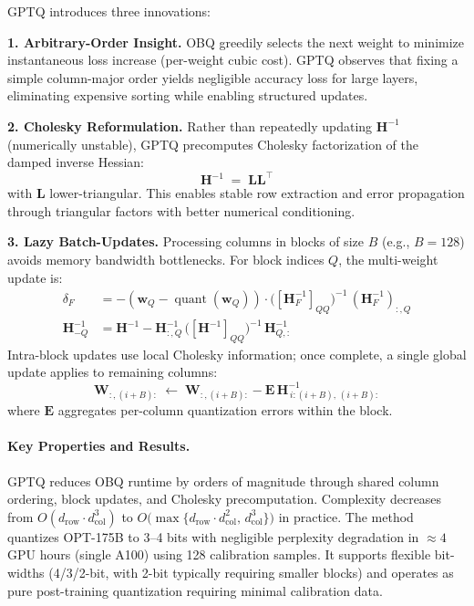 GPTQ introduces three innovations:

\textbf{1. Arbitrary-Order Insight.} OBQ greedily selects the next weight to minimize instantaneous loss increase (per-weight cubic cost). GPTQ observes that fixing a simple column-major order yields negligible accuracy loss for large layers, eliminating expensive sorting while enabling structured updates.

\textbf{2. Cholesky Reformulation.} Rather than repeatedly updating $\bm{H}^{-1}$ (numerically unstable), GPTQ precomputes Cholesky factorization of the damped inverse Hessian:
\begin{equation}
\bm{H}^{-1} \;=\; \bm{L}\bm{L}^\top
\end{equation}
with $\bm{L}$ lower-triangular. This enables stable row extraction and error propagation through triangular factors with better numerical conditioning.

\textbf{3. Lazy Batch-Updates.} Processing columns in blocks of size $B$ (e.g., $B=128$) avoids memory bandwidth bottlenecks. For block indices $Q$, the multi-weight update is:
\begin{align}
\delta_F &= - ( \bm{w}_Q - \operatorname{quant}(\bm{w}_Q) ) \cdot \big( [\bm{H}_F^{-1}]_{QQ} \big)^{-1} \, (\bm{H}_F^{-1})_{:,Q} \\
\bm{H}^{-1}_{-Q} &= \bm{H}^{-1} - \bm{H}^{-1}_{:,Q} \, \big( [\bm{H}^{-1}]_{QQ} \big)^{-1} \, \bm{H}^{-1}_{Q,:}
\end{align}
Intra-block updates use local Cholesky information; once complete, a single global update applies to remaining columns:
\begin{equation}
\bm{W}_{:,(i+B):} \;\leftarrow\; \bm{W}_{:,(i+B):} - \bm{E}\,\bm{H}^{-1}_{\,i:(i+B),\,(i+B):}
\end{equation}
where $\bm{E}$ aggregates per-column quantization errors within the block.

\paragraph{Key Properties and Results.}
GPTQ reduces OBQ runtime by orders of magnitude through shared column ordering, block updates, and Cholesky precomputation. Complexity decreases from $O(d_{\text{row}}\cdot d_{\text{col}}^{3})$ to $O\!\big(\max\{d_{\text{row}}\cdot d_{\text{col}}^{2},\, d_{\text{col}}^{3}\}\big)$ in practice. The method quantizes OPT-175B to 3–4 bits with negligible perplexity degradation in $\approx 4 $  GPU hours (single A100) using 128 calibration samples. It supports flexible bit-widths (4/3/2-bit, with 2-bit typically requiring smaller blocks) and operates as pure post-training quantization requiring minimal calibration data.

